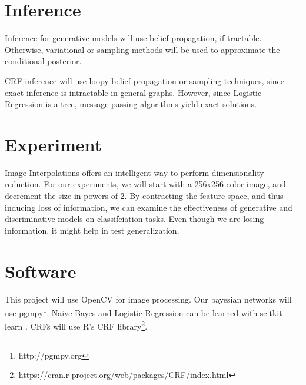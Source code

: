 \documentclass{article}
\begin{document}
\section{Inference}
Inference for generative models will use belief propagation, if tractable.
Otherwise, variational or sampling methods \cite{NUTS} will be
used to approximate the conditional posterior.

CRF inference will use loopy belief propagation or sampling techniques,
since exact inference is intractable in general graphs.
However, since Logistic Regression is a tree, message passing algorithms
yield exact solutions.

\section{Experiment}
Image Interpolations offers an intelligent way to perform dimensionality
reduction. For our experiments, we will start with a 256x256 color image, and
decrement the size in powers of 2. By contracting the feature space, and thus
inducing loss of information, we can examine
the effectiveness of generative and discriminative models on classifciation
tasks. Even though we are losing information, it might help in test generalization.

\section{Software}
\label{software}
This project will use OpenCV \cite{opencv} for image processing.
Our bayesian networks will use pgmpy\footnote{http://pgmpy.org}.
Naive Bayes and Logistic Regression can be learned with scitkit-learn \cite{scikit-learn}.
CRFs will use R's CRF library\footnote{https://cran.r-project.org/web/packages/CRF/index.html}.






\end{document}
